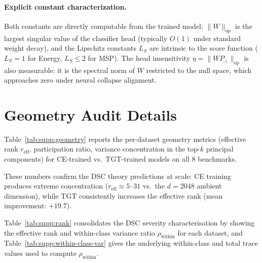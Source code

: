 \documentclass[runningheads]{llncs}
\newcommand{\tabref}[1]{Table~\ref{#1}}
\begin{document}
\paragraph{Explicit constant characterization.}
Both constants are directly computable from the trained model:
$\|W\|_{\mathrm{op}}$ is the largest singular value of the classifier head (typically $O(1)$ under standard weight decay),
and the Lipschitz constants $L_S$ are intrinsic to the score function ($L_S = 1$ for Energy, $L_S \le 2$ for MSP).
The head insensitivity $\eta = \|WP_\perp\|_{\mathrm{op}}$ is also measurable:
it is the spectral norm of $W$ restricted to the null space, which approaches zero under neural collapse alignment.

\section{Geometry Audit Details}
\label{sec:supp:geometry}

\tabref{tab:supp:geometry} reports the per-dataset geometry metrics (effective rank
$r_{\mathrm{eff}}$, participation ratio, variance concentration in the top-$k$ principal
components) for CE-trained vs.\ TGT-trained models on all 8 benchmarks.

\begin{table}[h]
  \centering
  \caption{Geometry audit: effective rank $r_{\mathrm{eff}}$, participation ratio (PR),
  and variance concentration in the top-64 PCs ($\rho_{64}$, in \%).
  ResNet-50 backbone ($d{=}2048$).}
  \label{tab:supp:geometry}
  \small
  \setlength{\tabcolsep}{4pt}
  \resizebox{\linewidth}{!}{}
\end{table}

These numbers confirm the DSC theory predictions at scale:
CE training produces extreme concentration ($r_{\mathrm{eff}} \approx 5$--$31$ vs.\ the
$d{=}2048$ ambient dimension),
while TGT consistently increases the effective rank (mean improvement: $+19.7$).

\tabref{tab:supp:rank} consolidates the DSC severity characterisation by showing the effective rank and within-class variance ratio $\rho_{\mathrm{within}}$ for each dataset, and \tabref{tab:supp:within-class-var} gives the underlying within-class and total trace values used to compute $\rho_{\mathrm{within}}$.
\end{document}

